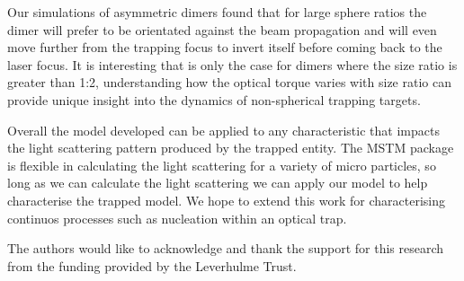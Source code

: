 \documentclass[review,3p]{elsarticle}
\begin{document}
Our simulations of asymmetric dimers found that for large sphere ratios the dimer will prefer to be orientated against the beam propagation and will even move further from the trapping focus to invert itself before coming back to the laser focus. It is interesting that is only the case for dimers where the size ratio is greater than 1:2, understanding how the optical torque varies with size ratio can provide unique insight into the dynamics of non-spherical trapping targets.  

Overall the model developed can be applied to any characteristic that impacts the light scattering pattern produced by the trapped entity. The MSTM package is flexible in  calculating the light scattering for a variety of micro particles, so long as we can calculate the light scattering we can apply our model to help characterise the trapped model. We hope to extend this work for characterising continuos processes such as nucleation within an optical trap.  

The authors would like to acknowledge and thank the support for this research from the funding provided by the Leverhulme Trust.  

 

\end{document}
